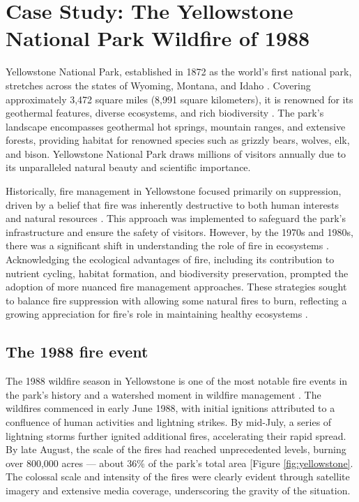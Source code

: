 \documentclass[
  12 pt,
]{Nemilov}
\begin{document}
\section{Case Study: The Yellowstone National Park Wildfire of 1988}\label{case-study-the-yellowstone-national-park-wildfire-of-1988}

Yellowstone National Park, established in 1872 as the world's first national park, stretches across the states of Wyoming, Montana, and Idaho \citep{haines1974yellowstone, jackson1942creation}. Covering approximately 3,472 square miles (8,991 square kilometers), it is renowned for its geothermal features, diverse ecosystems, and rich biodiversity \citep{chittenden2018yellowstone, keefer1971geologic}. The park's landscape encompasses geothermal hot springs, mountain ranges, and extensive forests, providing habitat for renowned species such as grizzly bears, wolves, elk, and bison. Yellowstone National Park draws millions of visitors annually due to its unparalleled natural beauty and scientific importance.

Historically, fire management in Yellowstone focused primarily on suppression, driven by a belief that fire was inherently destructive to both human interests and natural resources \citep{barker2013scorched}. This approach was implemented to safeguard the park's infrastructure and ensure the safety of visitors. However, by the 1970s and 1980s, there was a significant shift in understanding the role of fire in ecosystems \citep{sellers1976fire, taylor1973some}. Acknowledging the ecological advantages of fire, including its contribution to nutrient cycling, habitat formation, and biodiversity preservation, prompted the adoption of more nuanced fire management approaches. These strategies sought to balance fire suppression with allowing some natural fires to burn, reflecting a growing appreciation for fire's role in maintaining healthy ecosystems \citep{barker2013scorched}.

\subsection{The 1988 fire event}\label{the-1988-fire-event}

The 1988 wildfire season in Yellowstone is one of the most notable fire events in the park's history and a watershed moment in wildfire management \citep{romme1989historical}. The wildfires commenced in early June 1988, with initial ignitions attributed to a confluence of human activities and lightning strikes. By mid-July, a series of lightning storms further ignited additional fires, accelerating their rapid spread. By late August, the scale of the fires had reached unprecedented levels, burning over 800,000 acres --- about 36\% of the park's total area {[}Figure \ref{fig:yellowstone}\citep{nasa-yellowstone}. The colossal scale and intensity of the fires were clearly evident through satellite imagery and extensive media coverage, underscoring the gravity of the situation.
\end{document}
